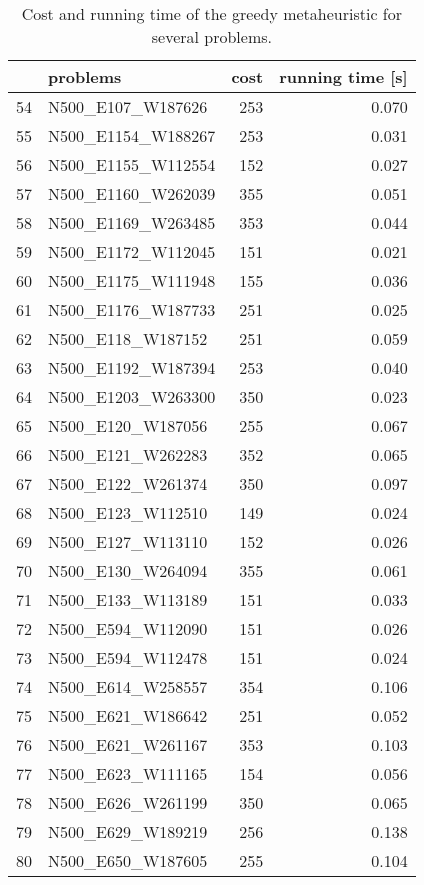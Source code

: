 \begin{table}[H]
\centering
\begin{tabular}{llrr}
\toprule
{} &            problems &  cost &  running time [s] \\
\midrule
54 &   N500\_E107\_W187626 &   253 &             0.070 \\
55 &  N500\_E1154\_W188267 &   253 &             0.031 \\
56 &  N500\_E1155\_W112554 &   152 &             0.027 \\
57 &  N500\_E1160\_W262039 &   355 &             0.051 \\
58 &  N500\_E1169\_W263485 &   353 &             0.044 \\
59 &  N500\_E1172\_W112045 &   151 &             0.021 \\
60 &  N500\_E1175\_W111948 &   155 &             0.036 \\
61 &  N500\_E1176\_W187733 &   251 &             0.025 \\
62 &   N500\_E118\_W187152 &   251 &             0.059 \\
63 &  N500\_E1192\_W187394 &   253 &             0.040 \\
64 &  N500\_E1203\_W263300 &   350 &             0.023 \\
65 &   N500\_E120\_W187056 &   255 &             0.067 \\
66 &   N500\_E121\_W262283 &   352 &             0.065 \\
67 &   N500\_E122\_W261374 &   350 &             0.097 \\
68 &   N500\_E123\_W112510 &   149 &             0.024 \\
69 &   N500\_E127\_W113110 &   152 &             0.026 \\
70 &   N500\_E130\_W264094 &   355 &             0.061 \\
71 &   N500\_E133\_W113189 &   151 &             0.033 \\
72 &   N500\_E594\_W112090 &   151 &             0.026 \\
73 &   N500\_E594\_W112478 &   151 &             0.024 \\
74 &   N500\_E614\_W258557 &   354 &             0.106 \\
75 &   N500\_E621\_W186642 &   251 &             0.052 \\
76 &   N500\_E621\_W261167 &   353 &             0.103 \\
77 &   N500\_E623\_W111165 &   154 &             0.056 \\
78 &   N500\_E626\_W261199 &   350 &             0.065 \\
79 &   N500\_E629\_W189219 &   256 &             0.138 \\
80 &   N500\_E650\_W187605 &   255 &             0.104 \\
\bottomrule
\end{tabular}
\caption{Cost and running time of the greedy metaheuristic for several problems.}
\label{table:greedy-medium-results-III}
\end{table}

